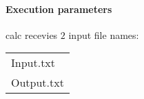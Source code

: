 \documentclass{article}
\begin{document}
\paragraph{Execution parameters}
calc recevies $2$ input file names:
\begin{table}[h]
\centering
\begin{tabular}{ l }
  Input.txt  \\
  Output.txt \\
\end{tabular}
\end{table}
\end{document}
